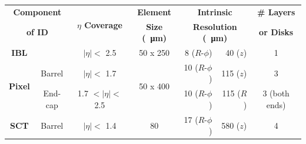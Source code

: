 
{\renewcommand{\arraystretch}{1.1}
  \begin{table}[!htb]
    \vspace{-0.2em}
\centering
\begin{tabular}{|cc||c|c|rr|c|}
  \hline
  \multicolumn{2}{|c||}{\textbf{Component}} & \multirow{2}{*}{\textbf{$\eta$ Coverage}} & \textbf{Element} &  \multicolumn{2}{c|}{\textbf{Intrinsic}} & \textbf{\# Layers} \\
  \multicolumn{2}{|c||}{\textbf{of ID}}     &       & \textbf{Size (\SI{}{\micro\metre})}  & \multicolumn{2}{c|}{\textbf{Resolution (\SI{}{\micro\metre})}} &  \textbf{or Disks}          \\
  \hline
  \multirow{2}{*}{\textbf{IBL}} & & \multirow{2}{*}{$|\eta| \lt$  2.5}   & \multirow{2}{*}{50 x 250} & \multirow{2}{*}{8 ($R$-$\phi$)}& \multirow{2}{*}{40 ($z$)}  & \multirow{2}{*}{1} \\ %
   &&&&&&\\\hline                                                                                                                                                  
  \multirow{2}{*}{\textbf{Pixel}} & Barrel    &  $|\eta| \lt$  1.7            & \multirow{2}{*}{50 x 400} & 10 ($R$-$\phi$)        & 115 ($z$)          & 3                \\ %
                         & End-cap   &         1.7  $\lt |\eta| \lt$  2.5    &                    & 10 ($R$-$\phi$)        & 115 ($R$)          & 3 (both ends)    \\ %
  \hline                                                                                                                                                
  \multirow{2}{*}{\textbf{SCT}}   & Barrel    & $|\eta| \lt$  1.4             &\multirow{2}{*}{80}       &  17 ($R$-$\phi$)        & 580 ($z$)          & 4                \\ %

\end{tabular}
\end{table}}
